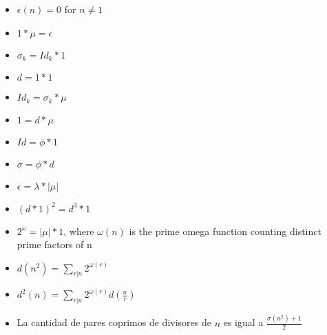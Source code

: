 {\normalsize
    \begin{itemize}
        \item $\epsilon(n) = 0$ for $n \neq 1$ 
        \item $1*\mu = \epsilon$
        \item $\sigma_k = Id_k*1$
        \item $d = 1 * 1$
        \item $Id_k = \sigma_k * \mu$
        \item $1 = d * \mu$
        \item $Id = \phi * 1$
        \item $\sigma = \phi * d$
        \item $\epsilon = \lambda*|\mu|$
        \item $(d*1)^2 = d^3*1$
        \item $2^\omega = |\mu|*1$, where ${\displaystyle \omega (n)}$ is the prime omega function counting distinct prime factors of n
        \item $\displaystyle d(n^2) = \sum_{r|n} 2^{\omega(r)}$ 
        \item $\displaystyle d^2(n) = \sum_{r|n} 2^{\omega(r)}d(\frac{n}{r})$ 
        \item La cantidad de pares coprimos de divisores de $n$ es igual a $\frac{\sigma(n^2)+1}{2}$
    \end{itemize} 
}
